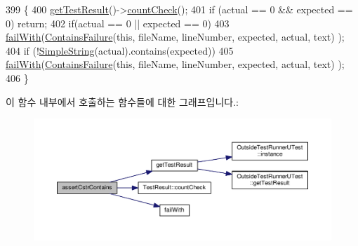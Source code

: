 \begin{DoxyCode}
399 \{
400     \hyperlink{class_utest_shell_a34c525b685e30431750d9e355fdfff0c}{getTestResult}()->\hyperlink{class_test_result_a58577489a2418efb4c440761e533f2e7}{countCheck}();
401     \textcolor{keywordflow}{if} (actual == 0 && expected == 0) \textcolor{keywordflow}{return};
402     \textcolor{keywordflow}{if}(actual == 0 || expected == 0)
403         \hyperlink{class_utest_shell_ad50ae28f5ad9f1d224832cb1f89365a7}{failWith}(\hyperlink{class_contains_failure}{ContainsFailure}(\textcolor{keyword}{this}, fileName, lineNumber, expected, actual, text)
      );
404     \textcolor{keywordflow}{if} (!\hyperlink{class_simple_string}{SimpleString}(actual).contains(expected))
405         \hyperlink{class_utest_shell_ad50ae28f5ad9f1d224832cb1f89365a7}{failWith}(\hyperlink{class_contains_failure}{ContainsFailure}(\textcolor{keyword}{this}, fileName, lineNumber, expected, actual, text)
      );
406 \}
\end{DoxyCode}


이 함수 내부에서 호출하는 함수들에 대한 그래프입니다.\+:
\nopagebreak
\begin{figure}[H]
\begin{center}
\leavevmode
\includegraphics[width=350pt]{class_utest_shell_a02142e9582af1a9e622200fe46a3a15f_cgraph}
\end{center}
\end{figure}


